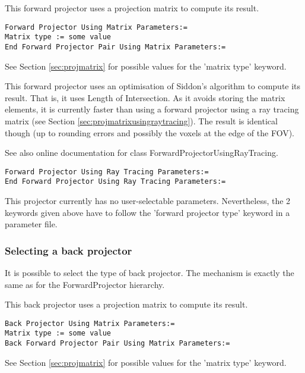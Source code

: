 \documentclass{article}
\begin{document}
This forward projector uses a projection matrix to compute its 
result.

{ 
}
\begin{verbatim}
Forward Projector Using Matrix Parameters:=
Matrix type := some value
End Forward Projector Pair Using Matrix Parameters:=
\end{verbatim}

See Section \ref{sec:projmatrix} for possible values for the 'matrix type' keyword.

{ 
}

This forward projector uses an optimisation of Siddon's algorithm 
to compute its result. That is, it uses Length of Intersection. 
As it avoids storing the matrix elements, it is currently faster 
than using a forward projector using a ray tracing matrix (see 
Section \ref{sec:projmatrixusingraytracing}). The result is identical though (up to rounding 
errors and possibly the voxels at the edge of the FOV).


See also online documentation for class ForwardProjectorUsingRayTracing.

{ 
}
\begin{verbatim}
Forward Projector Using Ray Tracing Parameters:=
End Forward Projector Using Ray Tracing Parameters:=
\end{verbatim}

This projector currently has no user-selectable parameters. Nevertheless, 
the 2 keywords given above have to follow the 'forward projector 
type' keyword in a parameter file.


\subsubsection{
Selecting a back projector}
\label{sec:backprojectors}
It is possible to select the type of back projector. The mechanism 
is exactly the same as for the ForwardProjector hierarchy.

{ 
}

This back projector uses a projection matrix to compute its result.

{ 
}
\begin{verbatim}
Back Projector Using Matrix Parameters:=
Matrix type := some value
Back Forward Projector Pair Using Matrix Parameters:=
\end{verbatim}

See Section \ref{sec:projmatrix} for possible values for the 'matrix type' keyword.
\end{document}
